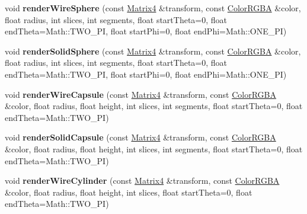\begin{DoxyCompactItemize}
\item 
void {\bfseries render\+Wire\+Sphere} (const \hyperlink{class_i_dream_sky_1_1_matrix4}{Matrix4} \&transform, const \hyperlink{class_i_dream_sky_1_1_color_r_g_b_a}{Color\+R\+G\+BA} \&color, float radius, int slices, int segments, float start\+Theta=0, float end\+Theta=Math\+::\+T\+W\+O\+\_\+\+PI, float start\+Phi=0, float end\+Phi=Math\+::\+O\+N\+E\+\_\+\+PI)\hypertarget{class_i_dream_sky_1_1_i_component_debug_renderer_a0b77ba6049876fd81bd6e4c41ecafb5d}{}\label{class_i_dream_sky_1_1_i_component_debug_renderer_a0b77ba6049876fd81bd6e4c41ecafb5d}

\item 
void {\bfseries render\+Solid\+Sphere} (const \hyperlink{class_i_dream_sky_1_1_matrix4}{Matrix4} \&transform, const \hyperlink{class_i_dream_sky_1_1_color_r_g_b_a}{Color\+R\+G\+BA} \&color, float radius, int slices, int segments, float start\+Theta=0, float end\+Theta=Math\+::\+T\+W\+O\+\_\+\+PI, float start\+Phi=0, float end\+Phi=Math\+::\+O\+N\+E\+\_\+\+PI)\hypertarget{class_i_dream_sky_1_1_i_component_debug_renderer_ae03d4196ce07074dfdec1a41648bb33e}{}\label{class_i_dream_sky_1_1_i_component_debug_renderer_ae03d4196ce07074dfdec1a41648bb33e}

\item 
void {\bfseries render\+Wire\+Capsule} (const \hyperlink{class_i_dream_sky_1_1_matrix4}{Matrix4} \&transform, const \hyperlink{class_i_dream_sky_1_1_color_r_g_b_a}{Color\+R\+G\+BA} \&color, float radius, float height, int slices, int segments, float start\+Theta=0, float end\+Theta=Math\+::\+T\+W\+O\+\_\+\+PI)\hypertarget{class_i_dream_sky_1_1_i_component_debug_renderer_ad2ddeded7d85647eb913d54e331a79cb}{}\label{class_i_dream_sky_1_1_i_component_debug_renderer_ad2ddeded7d85647eb913d54e331a79cb}

\item 
void {\bfseries render\+Solid\+Capsule} (const \hyperlink{class_i_dream_sky_1_1_matrix4}{Matrix4} \&transform, const \hyperlink{class_i_dream_sky_1_1_color_r_g_b_a}{Color\+R\+G\+BA} \&color, float radius, float height, int slices, int segments, float start\+Theta=0, float end\+Theta=Math\+::\+T\+W\+O\+\_\+\+PI)\hypertarget{class_i_dream_sky_1_1_i_component_debug_renderer_a5231d1da4e13f3c5e789435d769aef4d}{}\label{class_i_dream_sky_1_1_i_component_debug_renderer_a5231d1da4e13f3c5e789435d769aef4d}

\item 
void {\bfseries render\+Wire\+Cylinder} (const \hyperlink{class_i_dream_sky_1_1_matrix4}{Matrix4} \&transform, const \hyperlink{class_i_dream_sky_1_1_color_r_g_b_a}{Color\+R\+G\+BA} \&color, float radius, float height, int slices, float start\+Theta=0, float end\+Theta=Math\+::\+T\+W\+O\+\_\+\+PI)\hypertarget{class_i_dream_sky_1_1_i_component_debug_renderer_ab3e3aff91ea3b53df3491eb14e4fdf7a}{}\label{class_i_dream_sky_1_1_i_component_debug_renderer_ab3e3aff91ea3b53df3491eb14e4fdf7a}


\end{DoxyCompactItemize}
